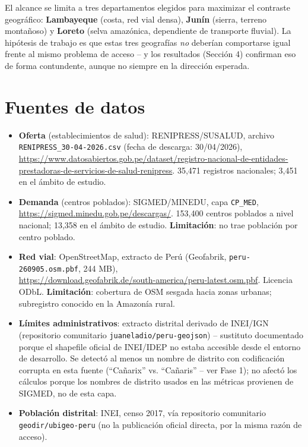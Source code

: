 \documentclass[11pt,a4paper]{article}
\begin{document}
El alcance se limita a tres departamentos elegidos para maximizar el
contraste geográfico: \textbf{Lambayeque} (costa, red vial densa),
\textbf{Junín} (sierra, terreno montañoso) y \textbf{Loreto} (selva
amazónica, dependiente de transporte fluvial). La hipótesis de trabajo es
que estas tres geografías \emph{no} deberían comportarse igual frente al
mismo problema de acceso -- y los resultados (Sección 4) confirman eso de
forma contundente, aunque no siempre en la dirección esperada.

\section{Fuentes de datos}
\begin{itemize}
  \item \textbf{Oferta} (establecimientos de salud): RENIPRESS/SUSALUD,
        archivo \texttt{RENIPRESS\_30-04-2026.csv} (fecha de descarga:
        30/04/2026), \\
        \url{https://www.datosabiertos.gob.pe/dataset/registro-nacional-de-entidades-prestadoras-de-servicios-de-salud-renipress}.
        35,471 registros nacionales; 3,451 en el ámbito de estudio.
  \item \textbf{Demanda} (centros poblados): SIGMED/MINEDU, capa
        \texttt{CP\_MED}, \\
        \url{https://sigmed.minedu.gob.pe/descargas/}. 153,400 centros
        poblados a nivel nacional; 13,358 en el ámbito de estudio.
        \textbf{Limitación}: no trae población por centro poblado.
  \item \textbf{Red vial}: OpenStreetMap, extracto de Perú (Geofabrik,
        \texttt{peru-260905.osm.pbf}, 244 MB), \\
        \url{https://download.geofabrik.de/south-america/peru-latest.osm.pbf}.
        Licencia ODbL. \textbf{Limitación}: cobertura de OSM sesgada hacia
        zonas urbanas; subregistro conocido en la Amazonía rural.
  \item \textbf{Límites administrativos}: extracto distrital derivado de
        INEI/IGN (repositorio comunitario \texttt{juaneladio/peru-geojson})
        -- sustituto documentado porque el shapefile oficial de INEI/IDEP no
        estaba accesible desde el entorno de desarrollo. Se detectó al menos
        un nombre de distrito con codificación corrupta en esta fuente
        (``Ca\~narix'' vs. ``Cañaris'' -- ver Fase 1); no afectó los cálculos
        porque los nombres de distrito usados en las métricas provienen de
        SIGMED, no de esta capa.
  \item \textbf{Población distrital}: INEI, censo 2017, vía repositorio
        comunitario \texttt{geodir/ubigeo-peru} (no la publicación oficial
        directa, por la misma razón de acceso).
\end{itemize}
\end{document}
